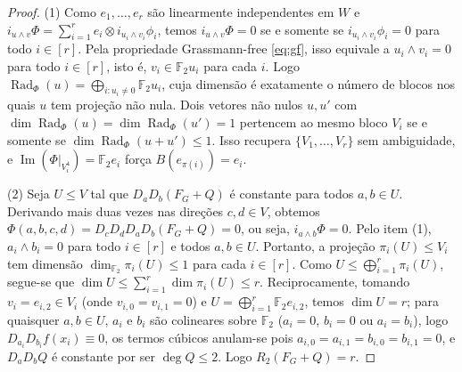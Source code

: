 \documentclass[11pt,a4paper]{article}
\theoremstyle{definition}
\theoremstyle{remark}
\newcommand{\F}{\mathbb{F}_2}
\newcommand{\Rad}{\operatorname{Rad}}
\begin{document}
\begin{proof}
(1) Como $e_1,\dots,e_r$ são linearmente independentes em $W$ e $i_{u\wedge v}\Phi = \sum_{i=1}^r e_i \otimes i_{u_i \wedge v_i}\phi_i$, temos $i_{u\wedge v}\Phi = 0$ se e somente se $i_{u_i \wedge v_i}\phi_i = 0$ para todo $i \in [r]$. Pela propriedade Grassmann-free \eqref{eq:gf}, isso equivale a $u_i \wedge v_i = 0$ para todo $i \in [r]$, isto é, $v_i \in \F u_i$ para cada $i$. Logo $\Rad_\Phi(u) = \bigoplus_{i : u_i \neq 0} \F u_i$, cuja dimensão é exatamente o número de blocos nos quais $u$ tem projeção não nula. Dois vetores não nulos $u, u'$ com $\dim\Rad_\Phi(u) = \dim\Rad_\Phi(u') = 1$ pertencem ao mesmo bloco $V_i$ se e somente se $\dim\Rad_\Phi(u+u') \le 1$. Isso recupera $\{V_1,\dots,V_r\}$ sem ambiguidade, e $\operatorname{Im}(\Phi|_{V_i^4}) = \F e_i$ força $B(e_{\pi(i)}) = e_i$.

(2) Seja $U \le V$ tal que $D_a D_b(F_G+Q)$ é constante para todos $a,b \in U$. Derivando mais duas vezes nas direções $c,d \in V$, obtemos $\Phi(a,b,c,d) = D_c D_d D_a D_b(F_G+Q) = 0$, ou seja, $i_{a\wedge b}\Phi = 0$. Pelo item (1), $a_i \wedge b_i = 0$ para todo $i \in [r]$ e todos $a,b \in U$. Portanto, a projeção $\pi_i(U) \le V_i$ tem dimensão $\dim_{\F}\pi_i(U) \le 1$ para cada $i \in [r]$. Como $U \le \bigoplus_{i=1}^r \pi_i(U)$, segue-se que $\dim U \le \sum_{i=1}^r \dim\pi_i(U) \le r$. Reciprocamente, tomando $v_i = e_{i,2} \in V_i$ (onde $v_{i,0} = v_{i,1} = 0$) e $U = \bigoplus_{i=1}^r \F e_{i,2}$, temos $\dim U = r$; para quaisquer $a,b \in U$, $a_i$ e $b_i$ são colineares sobre $\F$ ($a_i = 0$, $b_i = 0$ ou $a_i = b_i$), logo $D_{a_i}D_{b_i}f(x_i) \equiv 0$, os termos cúbicos anulam-se pois $a_{i,0}=a_{i,1}=b_{i,0}=b_{i,1}=0$, e $D_a D_b Q$ é constante por ser $\deg Q \le 2$. Logo $R_2(F_G+Q) = r$.


\end{proof}
\end{document}
